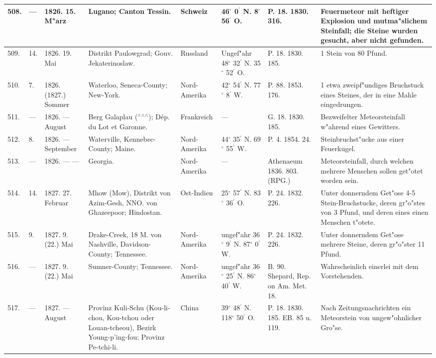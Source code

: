 \documentclass[a4paper, 8pt, oneside, polutonikogreek, german]{article}
\begin{document}
\begin{center}
\begin{longtable}{| p{5mm} | p{3mm} | p{15mm} | p{25mm} | p{20mm} | p{14mm} | p{17mm} | p{24mm} |}
        508. & --- & 1826. 15. M"arz & Lugano; Canton Tessin. & Schweiz & 46$^\circ$ 0$^\prime$ N. 8$^\circ$ 56$^\prime$ O. & P. 18. 1830. 316. & Feuermeteor mit heftiger Explosion und mutma"slichem Steinfall; die Steine wurden gesucht, aber nicht gefunden. \\ \hline
        509. & 14. & 1826. 19. Mai & Distrikt Paulowgrad; Gouv. Jekaterinoslaw. & Russland & Ungef"ahr 48$^\circ$ 32$^\prime$ N. 35$^\circ$ 52$^\prime$ O. & P. 18. 1830. 185. & 1 Stein von 80 Pfund. \\ \hline
        510. & 7. & 1826. (1827.) Sommer & Waterloo, Seneca-County; New-York. & Nord-Amerika & 42$^\circ$ 54$^\prime$ N. 77$^\circ$ 8$^\prime$ W. & P. 88. 1853. 176. & 1 etwa zweipf"undiges Bruchstuck eines Steines, der in eine Mahle eingedrungen. \\ \hline
        511. & --- & 1826. --- August & Berg Galaplau ($^\wedge$$^\wedge$$^\wedge$); Dép. du Lot et Garonne. & Frankreich & --- & G. 18. 1830. 185. & Bezweifelter Meteorsteinfall w"ahrend eines Gewitters. \\ \hline
        512. & 8. & 1826. --- September & Waterville, Kennebec-County; Maine. & Nord-Amerika & 44$^\circ$ 35$^\prime$ N. 69$^\circ$ 55$^\prime$ W. & P. 4. 1854. 24. & Steinbruchst"ucke aus einer Feuerkugel. \\ \hline
        513. & --- & 1826. --- --- & Georgia. & Nord-Amerika & --- & Athenaeum 1836. 803. (RPG.) & Meteorsteinfall, durch welchen mehrere Menschen sollen get"otet worden sein. \\ \hline
        514. & 14. & 1827. 27. Februar & Mhow (Mow), Distrikt von Azim-Gesh, NNO. von Ghazeepoor; Hindostan. & Ost-Indien & 25$^\circ$ 57$^\prime$ N. 83$^\circ$ 36$^\prime$ O. & P. 24. 1832. 226. & Unter donnerndem Get"ose 4-5 Stein-Bruchstucke, deren gr"o"stes von 3 Pfund, und deren eines einen Menschen t"otete. \\ \hline
        515. & 9. & 1827. 9. (22.) Mai & Drake-Creek, 18 M. von Nashville, Davidson-County; Tennessee. & Nord-Amerika & ungef"ahr 36$^\circ$ 9$^\prime$ N. 87$^\circ$ 0$^\prime$ W. & P. 24. 1832. 226. & Unter donnerndem Get"ose mehrere Steine, deren gr"o"ster 11 Pfund. \\ \hline
        516. & --- & 1827. 9. (22.) Mai & Sumner-County; Tennessee. & Nord-Amerika & ungef"ahr 36$^\circ$ 25$^\prime$ N. 86$^\circ$ 40$^\prime$ W. & B. 90. Shepard, Rep. on Am. Met. 18. & Wahrscheinlich einerlei mit dem Vorstehenden. \\ \hline
        517. & --- & 1827. --- August & Provinz Kuli-Schu (Kou-li-chou, Kou-tchou oder Louan-tcheou), Bezirk Young-p'ing-fou; Provinz Pe-tchi-li. & China & 39$^\circ$ 48$^\prime$ N. 118$^\circ$ 50$^\prime$ O. & P. 18. 1830. 185. EB. 85 u. 119. & Nach Zeitungsnachrichten ein Meteorstein von ungew"ohnlicher Gro"se. \\ \hline

\end{longtable}
\end{center}
\end{document}
